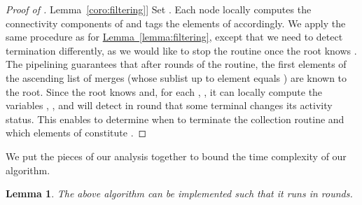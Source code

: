 \documentclass[letterpaper,11pt]{article}
\newtheorem{lemma}[theorem]{Lemma}
\newcommand{\namedref}[2]{\hyperref[#2]{#1~\ref*{#2}}}
\newcommand{\lemmaref}[1]{\namedref{Lemma}{#1}}
\begin{document}
\begin{proof}[Proof of \lemmaref{coro:filtering}]
Set . Each node  locally
computes the connectivity components of  and tags the elements of
 accordingly. We apply the same procedure as for
\lemmaref{lemma:filtering}, except that we need to detect termination
differently, as we would like to stop the routine once the root knows
. The pipelining guarantees that after  rounds of the routine,
the first  elements of the ascending list of merges (whose sublist up to
element  equals ) are known to the root. Since the root
knows  and, for each , , it can locally compute the
variables , , and will detect in round  that
some terminal changes its activity status. This enables to determine when to
terminate the collection routine and which elements of 
constitute .
\end{proof}
We put the pieces of our analysis together to bound the time complexity of our
algorithm.
\begin{lemma}\label{lemma:2_time}
The above algorithm can be implemented such that it runs in 
rounds.
\end{lemma}
\end{document}
